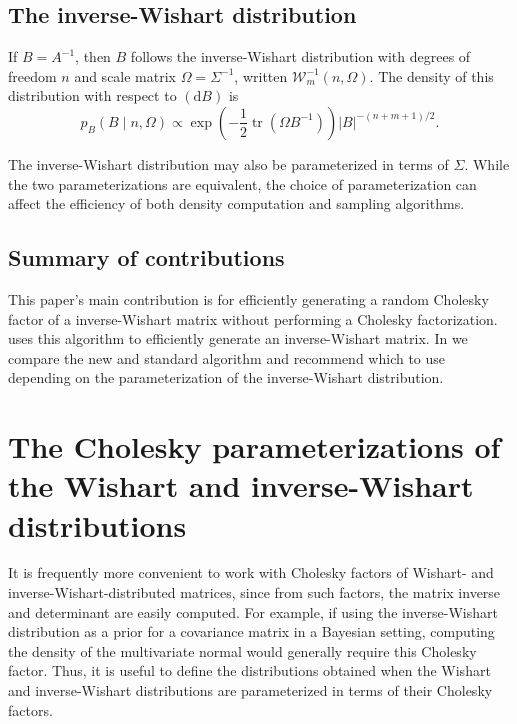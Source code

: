 \documentclass[12pt,a4paper,reqno]{amsart}
\numberwithin{equation}{section}
\newcommand{\invwishart}[1]{\mathcal{W}^{-1}_{#1}}
\renewcommand{\det}[1]{\left| {#1} \right|}
\newcommand{\dmeasure}[1]{\left(\dd{#1}\right)}
\newcommand{\dd}[1]{\mathrm{d}{#1}}
\newcommand{\tr}{\operatorname{tr}}
\begin{document}
\subsection*{The inverse-Wishart distribution}

If $B=A^{-1}$, then $B$ follows the inverse-Wishart distribution with degrees of freedom $n$ and scale matrix $\Omega = \Sigma^{-1}$, written $\invwishart{m}(n, \Omega)$.
The density of this distribution with respect to $\dmeasure{B}$ is
\begin{equation}\label{invwishartdensity}
    p_B(B \mid n, \Omega) \propto \exp\left(-\frac{1}{2}\tr(\Omega B^{-1})\right) \det{B}^{-(n+m+1)/2}.
\end{equation}

The inverse-Wishart distribution may also be parameterized in terms of $\Sigma$.
While the two parameterizations are equivalent, the choice of parameterization can affect the efficiency of both density computation and sampling algorithms.

\subsection*{Summary of contributions}

This paper's main contribution is  for efficiently generating a random Cholesky factor of a inverse-Wishart matrix without performing a Cholesky factorization.
 uses this algorithm to efficiently generate an inverse-Wishart matrix.
In  we compare the new and standard algorithm and recommend which to use depending on the parameterization of the inverse-Wishart distribution.

\section{The Cholesky parameterizations of the Wishart and inverse-Wishart distributions}

It is frequently more convenient to work with Cholesky factors of Wishart- and inverse-Wishart-distributed matrices, since from such factors, the matrix inverse and determinant are easily computed.
For example, if using the inverse-Wishart distribution as a prior for a covariance matrix in a Bayesian setting, computing the density of the multivariate normal would generally require this Cholesky factor.
Thus, it is useful to define the distributions obtained when the Wishart and inverse-Wishart distributions are parameterized in terms of their Cholesky factors.
\end{document}
